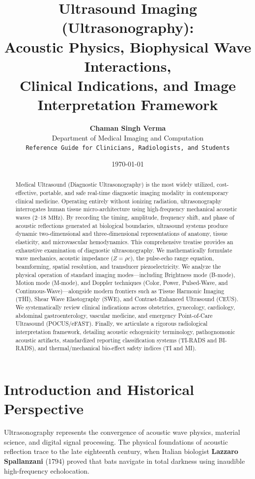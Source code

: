 \documentclass[11pt,a4paper]{article}
\title{\textbf{\huge Ultrasound Imaging (Ultrasonography):}\\[0.3em]
\Large Acoustic Physics, Biophysical Wave Interactions,\\
Clinical Indications, and Image Interpretation Framework}
\author{\textbf{Chaman Singh Verma}\\[0.2em]
\small Department of Medical Imaging and Computation\\
\small \texttt{Reference Guide for Clinicians, Radiologists, and Students}}
\date{\today}
\begin{document}
\maketitle

\begin{abstract}
Medical Ultrasound (Diagnostic Ultrasonography) is the most widely utilized, cost-effective, portable, and safe real-time diagnostic imaging modality in contemporary clinical medicine. Operating entirely without ionizing radiation, ultrasonography interrogates human tissue micro-architecture using high-frequency mechanical acoustic waves ($2\text{--}18\text{ MHz}$). By recording the timing, amplitude, frequency shift, and phase of acoustic reflections generated at biological boundaries, ultrasound systems produce dynamic two-dimensional and three-dimensional representations of anatomy, tissue elasticity, and microvascular hemodynamics. This comprehensive treatise provides an exhaustive examination of diagnostic ultrasonography. We mathematically formulate wave mechanics, acoustic impedance ($Z = \rho c$), the pulse-echo range equation, beamforming, spatial resolution, and transducer piezoelectricity. We analyze the physical operation of standard imaging modes—including Brightness mode (B-mode), Motion mode (M-mode), and Doppler techniques (Color, Power, Pulsed-Wave, and Continuous-Wave)—alongside modern frontiers such as Tissue Harmonic Imaging (THI), Shear Wave Elastography (SWE), and Contrast-Enhanced Ultrasound (CEUS). We systematically review clinical indications across obstetrics, gynecology, cardiology, abdominal gastroenterology, vascular medicine, and emergency Point-of-Care Ultrasound (POCUS/eFAST). Finally, we articulate a rigorous radiological interpretation framework, detailing acoustic echogenicity terminology, pathognomonic acoustic artifacts, standardized reporting classification systems (TI-RADS and BI-RADS), and thermal/mechanical bio-effect safety indices (TI and MI).
\end{abstract}

\tableofcontents
\newpage

\section{Introduction and Historical Perspective}

Ultrasonography represents the convergence of acoustic wave physics, material science, and digital signal processing. The physical foundations of acoustic reflection trace to the late eighteenth century, when Italian biologist \textbf{Lazzaro Spallanzani} (1794) proved that bats navigate in total darkness using inaudible high-frequency echolocation.
\end{document}
